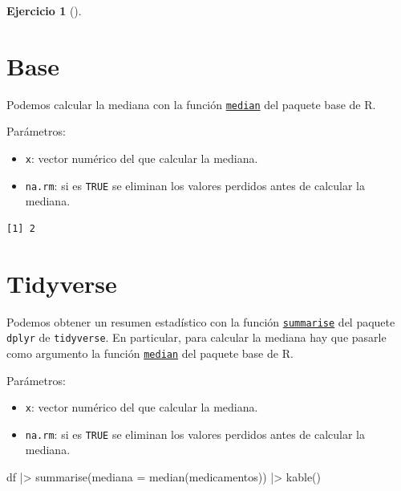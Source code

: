 \documentclass[
  a4paper,
]{scrreport}
\newenvironment{Shaded}{\begin{snugshade}}{\end{snugshade}}
\newcommand{\AttributeTok}[1]{\textcolor[rgb]{0.40,0.45,0.13}{#1}}
\newcommand{\FunctionTok}[1]{\textcolor[rgb]{0.28,0.35,0.67}{#1}}
\newcommand{\NormalTok}[1]{\textcolor[rgb]{0.00,0.23,0.31}{#1}}
\newcommand{\SpecialCharTok}[1]{\textcolor[rgb]{0.37,0.37,0.37}{#1}}
\providecommand{\tightlist}{%
  \setlength{\itemsep}{0pt}\setlength{\parskip}{0pt}}\usepackage{longtable,booktabs,array}
\theoremstyle{definition}
\newtheorem{exercise}{Ejercicio}[chapter]
\theoremstyle{remark}
\begin{document}
\begin{exercise}[]
\begin{enumerate}
\begin{tcolorbox}
  \section{Base}

  Podemos calcular la mediana con la función
  \href{https://www.rdocumentation.org/packages/base/versions/3.6.2/topics/median}{\texttt{median}}
  del paquete base de R.

  Parámetros:

  \begin{itemize}
  \tightlist
  \item
    \texttt{x}: vector numérico del que calcular la mediana.
  \item
    \texttt{na.rm}: si es \texttt{TRUE} se eliminan los valores perdidos
    antes de calcular la mediana.
  \end{itemize}

\begin{Shaded}
\end{Shaded}

\begin{verbatim}
[1] 2
\end{verbatim}

  \section{Tidyverse}

  Podemos obtener un resumen estadístico con la función
  \href{https://dplyr.tidyverse.org/reference/summarise.html}{\texttt{summarise}}
  del paquete \texttt{dplyr} de \texttt{tidyverse}. En particular, para
  calcular la mediana hay que pasarle como argumento la función
  \href{https://www.rdocumentation.org/packages/base/versions/3.6.2/topics/median}{\texttt{median}}
  del paquete base de R.

  Parámetros:

  \begin{itemize}
  \tightlist
  \item
    \texttt{x}: vector numérico del que calcular la mediana.
  \item
    \texttt{na.rm}: si es \texttt{TRUE} se eliminan los valores perdidos
    antes de calcular la mediana.
  \end{itemize}

\begin{Shaded}
\begin{Highlighting}[]
\NormalTok{df }\SpecialCharTok{|\textgreater{}} \FunctionTok{summarise}\NormalTok{(}\AttributeTok{mediana =} \FunctionTok{median}\NormalTok{(medicamentos)) }\SpecialCharTok{|\textgreater{}}
    \FunctionTok{kable}\NormalTok{()}
\end{Highlighting}
\end{Shaded}


\end{tcolorbox}
\end{enumerate}
\end{exercise}
\end{document}
